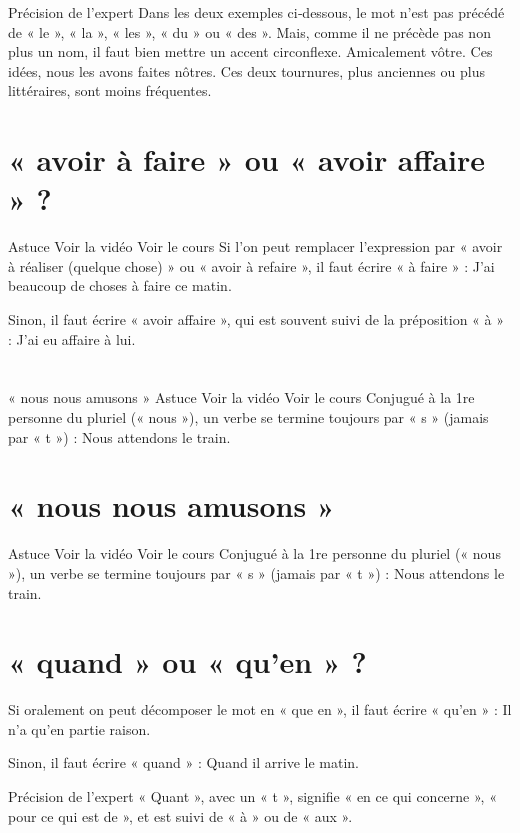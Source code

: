 Précision de l'expert
Dans les deux exemples ci‑dessous, le mot n'est pas précédé de « le », « la », « les », « du » ou « des ». Mais, comme il ne précède pas non plus un nom, il faut bien mettre un accent circonflexe.
Amicalement vôtre.
Ces idées, nous les avons faites nôtres.
Ces deux tournures, plus anciennes ou plus littéraires, sont moins fréquentes.



\section{« avoir à faire » ou « avoir affaire » ?}

Astuce Voir la vidéo Voir le cours
Si l'on peut remplacer l'expression par « avoir à réaliser (quelque chose) » ou « avoir à refaire », il faut écrire « à faire » : J'ai beaucoup de choses à faire ce matin.

Sinon, il faut écrire « avoir affaire », qui est souvent suivi de la préposition « à » : J'ai eu affaire à lui.


\section{}
« nous nous amusons »
Astuce Voir la vidéo Voir le cours
Conjugué à la 1re personne du pluriel (« nous »), un verbe se termine toujours par « s » (jamais par « t ») : Nous attendons le train.



\section{« nous nous amusons »}

Astuce Voir la vidéo Voir le cours
Conjugué à la 1re personne du pluriel (« nous »), un verbe se termine toujours par « s » (jamais par « t ») : Nous attendons le train.

\section{« quand » ou « qu'en » ?}

Si oralement on peut décomposer le mot en « que en », il faut écrire « qu'en » : Il n'a qu'en partie raison.

Sinon, il faut écrire « quand » : Quand il arrive le matin.

Précision de l'expert
« Quant », avec un « t », signifie « en ce qui concerne », « pour ce qui est de », et est suivi de « à » ou de « aux ».

